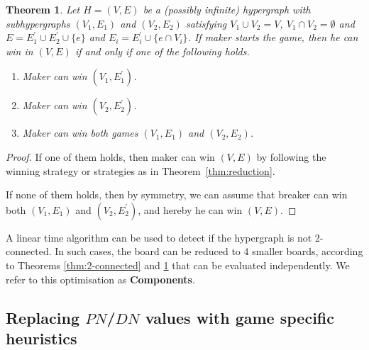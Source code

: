 \documentclass[conference]{IEEEtran}
\newtheorem{theorem}{Theorem}[section]
\theoremstyle{definition}
\newcommand{\pn}{$PN$\xspace}
\newcommand{\dn}{$DN$\xspace}
\begin{document}
\begin{theorem}
\label{thm:2-edge-connected}
Let $H = (V, E)$ be a (possibly infinite) hypergraph with subhypergraphs $(V_1, E_1)$ and $(V_2, E_2)$ satisfying $V_1 \cup V_2 = V$, $V_1 \cap V_2 = \emptyset$ and $E = E_1^{\prime} \cup E_2^{\prime} \cup \{e\}$ and $E_i = E_i^{\prime} \cup \{e \cap V_i\}$. If maker starts the game, then he can win in $(V, E)$ if and only if one of the following holds.
\begin{enumerate}
    \item Maker can win $(V_1, E_1^{\prime})$.
    \item Maker can win $(V_2, E_2^{\prime})$.
    \item Maker can win both games $(V_1, E_1)$ and $(V_2, E_2)$.
\end{enumerate}
\end{theorem}

\begin{proof}
If one of them holds, then maker can win $(V, E)$ by following the winning strategy or strategies as in Theorem~\ref{thm:reduction}.

If none of them holds, then by symmetry, we can assume that breaker can win both $(V_1, E_1)$ and $(V_2, E_2^{\prime})$, and hereby he can win $(V, E)$.
\end{proof}

A linear time algorithm can be used to detect if the hypergraph is not 2-connected. In such cases, the board can be reduced to 4 smaller boards, according to Theorems \ref{thm:2-connected} and \ref{thm:2-edge-connected} that can be evaluated independently. We refer to this optimisation as {\bf Components}.


\subsection{Replacing \pn/\dn values with game specific heuristics} \label{Heuristic_PN_DN}
\end{document}
